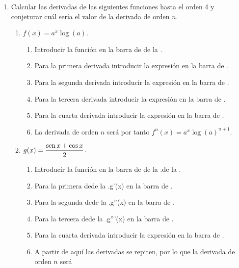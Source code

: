 \begin{enumerate}[leftmargin=*]
\item  Calcular las derivadas de las siguientes funciones hasta el orden 4 y conjeturar cuál sería el valor de la derivada de orden $n$.
      \begin{enumerate}
      \item  $f(x)=a^x\log(a)$.
            \begin{indication}
            \begin{enumerate}
            \item Introducir la función  en la barra de  de la .
            \item Para la primera derivada introducir la expresión  en la barra de .
            \item Para la segunda derivada introducir la expresión  en la barra de .
            \item Para la tercera derivada introducir la expresión  en la barra de .
            \item Para la cuarta derivada introducir la expresión  en la barra de .
            \item La derivada de orden $n$ será por tanto $f^n(x)=a^x\log(a)^{n+1}$.
            \end{enumerate}
            \end{indication}
      \item  $g(x)=\dfrac{\operatorname{sen} x +\cos x}{2}$.
            \begin{indication}
            \begin{enumerate}
            \item Introducir la función  en la barra de  de la .de la .
            \item Para la primera dede la .{g'(x)} en la barra de .
            \item Para la segunda dede la .{g''(x)} en la barra de .
            \item Para la tercera dede la .{g'''(x)} en la barra de .
            \item Para la cuarta derivada introducir la expresión  en la barra de .
            \item A partir de aquí las derivadas se repiten, por lo que la derivada de orden $n$ será

\end{enumerate}
\end{indication}
\end{enumerate}
\end{enumerate}
